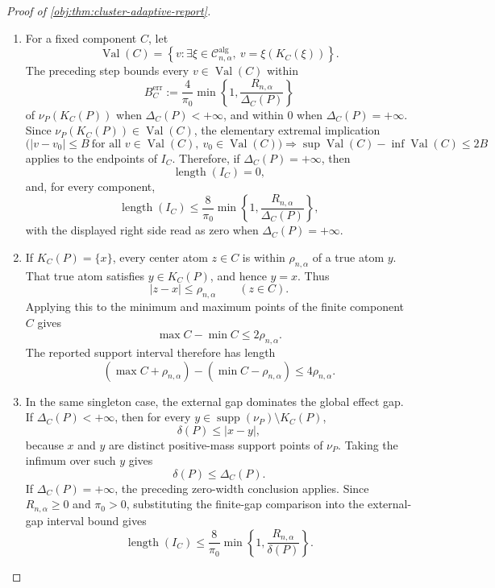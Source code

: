 \begin{proof}[Proof of \cref{obj:thm:cluster-adaptive-report}]
\begin{enumerate}
\item For a fixed component \(C\), let
\[
\operatorname{Val}(C)
=
\left\{v:\exists \xi\in\mathcal C^{\mathrm{alg}}_{n,\alpha},\
v=\xi(K_C(\xi))\right\}.
\]
The preceding step bounds every \(v\in\operatorname{Val}(C)\) within
\[
B_C^{\mathrm{err}}
:=
\frac{4}{\pi_0}
\min\left\{1,\frac{R_{n,\alpha}}{\Delta_C(P)}\right\}
\]
of \(\nu_P(K_C(P))\) when \(\Delta_C(P)<+\infty\), and within \(0\) when
\(\Delta_C(P)=+\infty\).  Since
\(\nu_P(K_C(P))\in\operatorname{Val}(C)\), the elementary extremal implication
\[
\bigl(|v-v_0|\le B\ \text{for all }v\in\operatorname{Val}(C),\
v_0\in\operatorname{Val}(C)\bigr)
\Longrightarrow
\sup\operatorname{Val}(C)-\inf\operatorname{Val}(C)\le2B
\]
applies to the endpoints of \(I_C\).  Therefore, if \(\Delta_C(P)=+\infty\),
then
\[
\operatorname{length}(I_C)=0,
\]
and, for every component,
\[
\operatorname{length}(I_C)
\le
\frac{8}{\pi_0}
\min\left\{1,\frac{R_{n,\alpha}}{\Delta_C(P)}\right\},
\]
with the displayed right side read as zero when
\(\Delta_C(P)=+\infty\). %

\item If \(K_C(P)=\{x\}\), every center atom \(z\in C\) is within
\(\rho_{n,\alpha}\) of a true atom \(y\).  That true atom satisfies
\(y\in K_C(P)\), and hence \(y=x\).  Thus
\[
|z-x|\le\rho_{n,\alpha}\qquad(z\in C).
\]
Applying this to the minimum and maximum points of the finite component \(C\)
gives
\[
\max C-\min C\le2\rho_{n,\alpha}.
\]
The reported support interval therefore has length
\[
(\max C+\rho_{n,\alpha})-(\min C-\rho_{n,\alpha})
\le4\rho_{n,\alpha}. %
\]

\item In the same singleton case, the external gap dominates the global effect
gap.  If \(\Delta_C(P)<+\infty\), then for every
\(y\in\operatorname{supp}(\nu_P)\setminus K_C(P)\),
\[
\delta(P)\le |x-y|,
\]
because \(x\) and \(y\) are distinct positive-mass support points of
\(\nu_P\).  Taking the infimum over such \(y\) gives
\[
\delta(P)\le \Delta_C(P).
\]
If \(\Delta_C(P)=+\infty\), the preceding zero-width conclusion applies.  Since
\(R_{n,\alpha}\ge0\) and \(\pi_0>0\), substituting the finite-gap comparison
into the external-gap interval bound gives
\[
\operatorname{length}(I_C)
\le
\frac{8}{\pi_0}
\min\left\{1,\frac{R_{n,\alpha}}{\delta(P)}\right\}. %
\]


\end{enumerate}
\end{proof}
